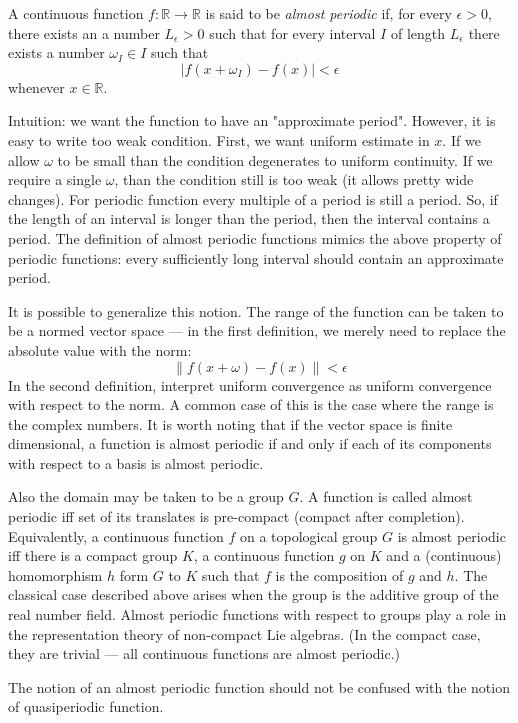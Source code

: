 \documentclass[12pt]{article}
\begin{document}
A continuous function $f \colon \mathbb{R} \to \mathbb{R}$ is said to be \emph{almost periodic} if, for every $\epsilon > 0$, there exists an a number $L_\epsilon > 0$ such that for every interval $I$ of length $L_\epsilon$ there exists a number $\omega_I \in I$ such that 
 $$| f(x + \omega_I) - f(x) | < \epsilon$$
whenever $x \in \mathbb{R}$. 

Intuition: we want the function to have an "approximate period".
However, it is easy to write too weak condition. First, we want
uniform estimate in $x$. If we allow $ \omega$ to be small than
the condition degenerates to uniform continuity. If we require
a single $ \omega$, than the condition still is too weak (it
allows pretty wide changes). For periodic function every multiple
of a period is still a period. So, if the length of an interval
is longer than the period, then the interval contains a period.
The definition of almost periodic functions mimics the above
property of periodic functions: every sufficiently long interval
should contain an approximate period.

It is possible to generalize this notion.  The range of the function can be taken to be a normed vector space --- in the first definition, we merely need to replace the absolute value with the norm:
 $$\| f(x + \omega) - f(x) \| < \epsilon$$
In the second definition, interpret uniform convergence as uniform convergence with respect to the norm.  A common case of this is the case where the range is the complex numbers.  It is worth noting that if the vector space is finite dimensional, a function is almost periodic if and only if each of its components with respect to a basis is almost periodic.

Also the domain may be taken to be a group $G$.  A function is called almost periodic iff set of its translates is pre-compact (compact after completion).
Equivalently, a continuous function $f$ on a topological group $G$ is
almost periodic iff there is a compact group $K$, a continuous
function $g$ on $K$ and a (continuous) homomorphism $h$ form $G$ 
to $K$ such that $f$ is the composition of $g$ and $h$. 
 The classical case described above arises when the group is the additive group of the real number field.  Almost periodic functions with respect to groups play a role in the representation theory of non-compact Lie algebras.  (In the compact case, they are trivial --- all continuous functions are almost periodic.)

The notion of an almost periodic function should not be confused with the notion of quasiperiodic function.
\end{document}
